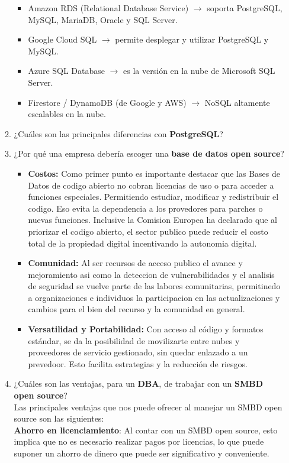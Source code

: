 \documentclass[12pt]{report}
\begin{document}
\begin{enumerate}[label=\roman*.]
\begin{enumerate}[label=\textbf{\arabic*.}, itemsep=2.0em]
\begin{itemize}
    \item Amazon RDS (Relational Database Service) $\rightarrow$ soporta PostgreSQL, MySQL, MariaDB, Oracle y SQL Server.
    \item Google Cloud SQL $\rightarrow$ permite desplegar y utilizar PostgreSQL y MySQL.
    \item Azure SQL Database $\rightarrow$ es la versión en la nube de Microsoft SQL Server.
    \item Firestore / DynamoDB (de Google y AWS) $\rightarrow$ NoSQL altamente escalables en la nube.
\end{itemize}
  \item ¿Cuáles son las principales diferencias con \textbf{PostgreSQL}?

  \item ¿Por qué una empresa debería escoger una \textbf{base de datos open source}?
 \begin{itemize}
      \item \textbf{Costos:}
            Como primer punto es importante destacar que las Bases de Datos de codigo abierto no cobran licencias de uso o para acceder a funciones especiales. Permitiendo estudiar, modificar y redistribuir el codigo. Eso evita la dependencia a los provedores para parches o nuevas funciones. Inclusive la Comision Europea ha declarado que al priorizar el codigo abierto, el sector publico puede reducir el costo total de la propiedad digital incentivando la autonomia digital. 
        \item \textbf{Comunidad:}
            Al ser recursos de acceso publico el avance y mejoramiento asi como  la deteccion de vulnerabilidades y el analisis de seguridad se vuelve parte de las labores comunitarias, permitinedo a organizaciones e individuos la participacion en las actualizaciones y cambios para el bien del recurso y la comunidad en general.
        
        \item \textbf{Versatilidad y Portabilidad:}
            Con acceso al código y formatos estándar, se da la posibilidad de movilizarte entre nubes y proveedores de servicio gestionado, sin quedar enlazado a un prevedoor. Esto facilita estrategias y la reducción de riesgos.

\end{itemize}




  \item ¿Cuáles son las ventajas, para un \textbf{DBA}, de trabajar con un \textbf{SMBD open source}?\\
Las principales ventajas que nos puede ofrecer al manejar un SMBD open source son las siguientes:\\
\textbf{Ahorro en licenciamiento}: Al contar con un SMBD open source, esto implica que no es necesario realizar pagos por licencias, lo que puede suponer un ahorro de dinero que puede ser significativo y conveniente.


\end{enumerate}
\end{enumerate}
\end{document}
